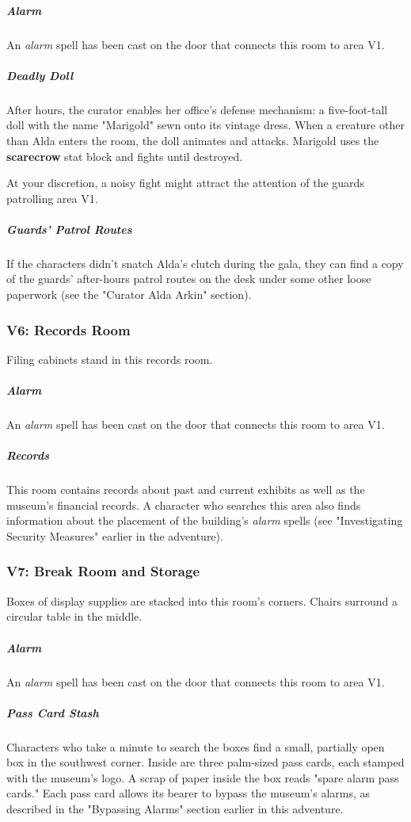 \documentclass[10pt,a4paper,twoside,bg=print,twocolumn,openany,nodeprecatedcode]{dndbook}
\begin{document}
\subparagraph{Alarm}
An \textit{alarm} spell has been cast on the door that connects this room to area V1.

\subparagraph{Deadly Doll}
After hours, the curator enables her office's defense mechanism: a five-foot-tall doll with the name "Marigold" sewn onto its vintage dress. When a creature other than Alda enters the room, the doll animates and attacks. Marigold uses the \textbf{scarecrow} stat block and fights until destroyed.

At your discretion, a noisy fight might attract the attention of the guards patrolling area V1.

\subparagraph{Guards' Patrol Routes}
If the characters didn't snatch Alda's clutch during the gala, they can find a copy of the guards' after-hours patrol routes on the desk under some other loose paperwork (see the "Curator Alda Arkin" section).

\subsubsection{V6: Records Room}
\begin{DndReadAloud}{}
Filing cabinets stand in this records room.

\end{DndReadAloud}

\subparagraph{Alarm}
An \textit{alarm} spell has been cast on the door that connects this room to area V1.

\subparagraph{Records}
This room contains records about past and current exhibits as well as the museum's financial records. A character who searches this area also finds information about the placement of the building's \textit{alarm} spells (see "Investigating Security Measures" earlier in the adventure).

\subsubsection{V7: Break Room and Storage}
\begin{DndReadAloud}{}
Boxes of display supplies are stacked into this room's corners. Chairs surround a circular table in the middle.

\end{DndReadAloud}

\subparagraph{Alarm}
An \textit{alarm} spell has been cast on the door that connects this room to area V1.

\subparagraph{Pass Card Stash}
Characters who take a minute to search the boxes find a small, partially open box in the southwest corner. Inside are three palm-sized pass cards, each stamped with the museum's logo. A scrap of paper inside the box reads "spare alarm pass cards." Each pass card allows its bearer to bypass the museum's alarms, as described in the "Bypassing Alarms" section earlier in this adventure.
\end{document}
